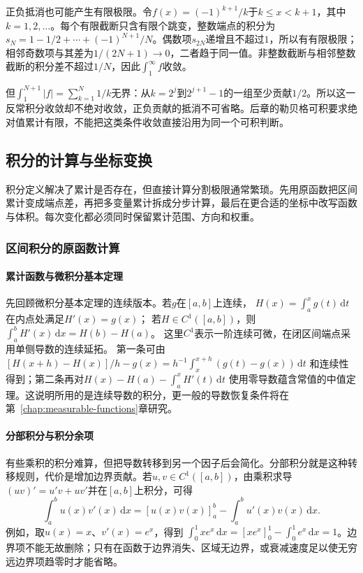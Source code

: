 正负抵消也可能产生有限极限。令$f(x)=(-1)^{k+1}/k$于$k\leq x<k+1$，其中$k=1,2,\ldots$。每个有限截断只含有限个跳变，整数端点的积分为$s_N=1-1/2+\cdots+(-1)^{N+1}/N$。偶数项$s_{2N}$递增且不超过$1$，所以有有限极限；相邻奇数项与其差为$1/(2N+1)\to0$，二者趋于同一值。非整数截断与相邻整数截断的积分差不超过$1/N$，因此$\int_1^\infty f$收敛。

但$\int_1^{N+1}|f|=\sum_{k=1}^N1/k$无界：从$k=2^j$到$2^{j+1}-1$的一组至少贡献$1/2$。所以这一反常积分收敛却不绝对收敛，正负贡献的抵消不可省略。后章的勒贝格可积要求绝对值累计有限，不能把这类条件收敛直接沿用为同一个可积判断。

\subsection{积分的计算与坐标变换}

积分定义解决了累计是否存在，但直接计算分割极限通常繁琐。先用原函数把区间累计变成端点差，再把多变量累计拆成分步计算，最后在更合适的坐标中改写函数与体积。每次变化都必须同时保留累计范围、方向和权重。

\subsubsection{区间积分的原函数计算}
\label{sec:analysis-integration-remainders}

\paragraph{累计函数与微积分基本定理}

先回顾微积分基本定理的连续版本。若$g$在$[a,b]$上连续，
$H(x)=\int_a^xg(t)\,\mathrm dt$在内点处满足$H'(x)=g(x)$；
若$H\in C^1([a,b])$，则$\int_a^bH'(x)\,\mathrm dx=H(b)-H(a)$。
这里$C^1$表示一阶连续可微，在闭区间端点采用单侧导数的连续延拓。
第一条可由
$[H(x+h)-H(x)]/h-g(x)=h^{-1}\int_x^{x+h}(g(t)-g(x))\,\mathrm dt$
和连续性得到；第二条再对$H(x)-H(a)-\int_a^xH'(t)\,\mathrm dt$
使用零导数蕴含常值的中值定理。这说明所用的是连续导数的积分，更一般的导数恢复条件将在第~\ref{chap:measurable-functions}章研究。

\paragraph{分部积分与积分余项}

有些乘积的积分难算，但把导数转移到另一个因子后会简化。分部积分就是这种转移规则，代价是增加边界贡献。若$u,v\in C^1([a,b])$，由乘积求导$(uv)'=u'v+uv'$并在$[a,b]$上积分，可得
\begin{equation}
  \int_a^b u(x)v'(x)\,\mathrm{d}x
  =
  [u(x)v(x)]_a^b
  -
  \int_a^b u'(x)v(x)\,\mathrm{d}x.
\label{eq:analysis-integration-by-parts}
\end{equation}
例如，取$u(x)=x$、$v'(x)=e^x$，得到 $\int_0^1xe^x\,\mathrm{d}x=[xe^x]_0^1-\int_0^1e^x\,\mathrm{d}x=1$。边界项不能无故删除；只有在函数于边界消失、区域无边界，或衰减速度足以使无穷远边界项趋零时才能省略。

